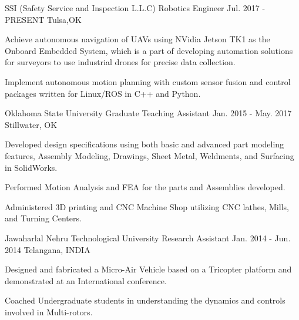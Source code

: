

\begin{cventries}

  \cventry
    {SSI (Safety Service and Inspection L.L.C)}      %
    {Robotics Engineer} %
    {Jul. 2017 - PRESENT} %
    {Tulsa,OK} %
    {
      \begin{cvitems} %
        \item {Achieve autonomous navigation of UAVs using NVidia Jetson TK1 as the Onboard Embedded System, which is a part of developing automation solutions for surveyors to use industrial drones for precise data collection.}
        \item {Implement autonomous motion planning with custom sensor fusion and control packages written for Linux/ROS in C++ and Python.}
      \end{cvitems}
    }

  \cventry
    {Oklahoma State University} %
    {Graduate Teaching Assistant} %
    {Jan. 2015 - May. 2017} %
    {Stillwater, OK} %
    {
      \begin{cvitems} %
        \item {Developed design specifications using both basic and advanced part modeling features, Assembly Modeling, Drawings, Sheet Metal, Weldments, and Surfacing in SolidWorks.}
        \item {Performed Motion Analysis and FEA for the parts and Assemblies developed.}
        \item {Administered 3D printing and CNC Machine Shop utilizing CNC lathes, Mills, and Turning Centers.}
      \end{cvitems}
    }

  \cventry
    {Jawaharlal Nehru Technological University} %
    {Research Assistant} %
    {Jan. 2014 - Jun. 2014} %
    {Telangana, INDIA} %
    {
      \begin{cvitems} %
        \item {Designed and fabricated a Micro-Air Vehicle based on a Tricopter platform and demonstrated at an International conference.}
        \item {Coached Undergraduate students in understanding the dynamics and controls involved in Multi-rotors.}
      \end{cvitems}
    }

\end{cventries}
